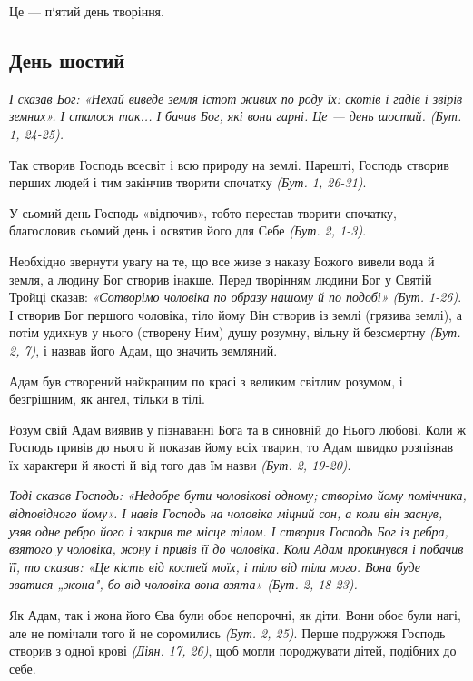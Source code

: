 \documentclass[main.tex]{subfiles}
\begin{document}
Це — п`ятий день творіння.

\subsection{День шостий}

\emph{І сказав Бог: {\color{red} «Нехай виведе земля істот живих по роду їх: скотів і гадів і звірів земних»}. І сталося так... І бачив Бог, які вони гарні. Це — день шостий. (Бут. 1, 24-25).}

Так створив Господь всесвіт і всю природу на землі. Нарешті, Господь створив перших людей і тим закінчив творити спочатку \emph{(Бут. 1, 26-31)}.

У сьомий день Господь «відпочив», тобто перестав творити спочатку, благословив сьомий день і освятив його для Себе \emph{(Бут. 2, 1-3)}.

Необхідно звернути увагу на те, що все живе з наказу Божого вивели вода й земля, а людину Бог створив інакше. Перед творінням людини Бог у Святій Тройці сказав: \emph{{\color{red} «Сотворімо чоловіка по образу нашому й по подобі»} (Бут. 1-26)}. І створив Бог першого чоловіка, тіло йому Він створив із землі (грязива землі), а потім удихнув у нього (створену Ним) душу розумну, вільну й безсмертну \emph{(Бут. 2, 7)}, і назвав його Адам, що значить земляний.

Адам був створений найкращим по красі з великим світлим розумом, і безгрішним, як ангел, тільки в тілі.

Розум свій Адам виявив у пізнаванні Бога та в синовній до Нього любові. Коли ж Господь привів до нього й показав йому всіх тварин, то Адам швидко розпізнав їх характери й якості й від того дав їм назви \emph{(Бут. 2, 19-20)}.
 
\emph{Тоді сказав Господь: {\color{red} «Недобре бути чоловікові одному; створімо йому помічника, відповідного йому»}. І навів Господь на чоловіка міцний сон, а коли він заснув, узяв одне ребро його і закрив те місце тілом. І створив Господь Бог із ребра, взятого у чоловіка, жону і привів її до чоловіка. Коли Адам прокинувся і побачив її, то сказав: «Це кість від костей моїх, і тіло від тіла мого. Вона буде зватися „жона", бо від чоловіка вона взята» (Бут. 2, 18-23).}

Як Адам, так і жона його Єва були обоє непорочні, як діти. Вони обоє були нагі, але не помічали того й не соромились \emph{(Бут. 2, 25)}. Перше подружжя Господь створив з одної крові \emph{(Діян. 17, 26)}, щоб могли породжувати дітей, подібних до себе.
\end{document}
